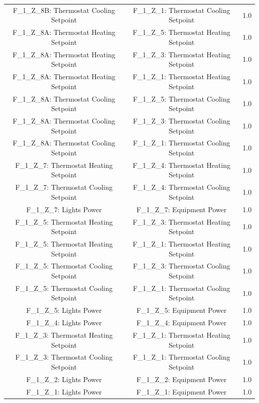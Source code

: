 \documentclass[aps, 10pt, a4paper]{article}
\begin{document}
\begin{longtable}{c|c||c}
                    F\_1\_Z\_8B: Thermostat Cooling Setpoint & F\_1\_Z\_1: Thermostat Cooling Setpoint & 1.0 \\
                    F\_1\_Z\_8A: Thermostat Heating Setpoint & F\_1\_Z\_5: Thermostat Heating Setpoint & 1.0 \\
                    F\_1\_Z\_8A: Thermostat Heating Setpoint & F\_1\_Z\_3: Thermostat Heating Setpoint & 1.0 \\
                    F\_1\_Z\_8A: Thermostat Heating Setpoint & F\_1\_Z\_1: Thermostat Heating Setpoint & 1.0 \\
                    F\_1\_Z\_8A: Thermostat Cooling Setpoint & F\_1\_Z\_5: Thermostat Cooling Setpoint & 1.0 \\
                    F\_1\_Z\_8A: Thermostat Cooling Setpoint & F\_1\_Z\_3: Thermostat Cooling Setpoint & 1.0 \\
                    F\_1\_Z\_8A: Thermostat Cooling Setpoint & F\_1\_Z\_1: Thermostat Cooling Setpoint & 1.0 \\
                    F\_1\_Z\_7: Thermostat Heating Setpoint & F\_1\_Z\_4: Thermostat Heating Setpoint & 1.0 \\
                    F\_1\_Z\_7: Thermostat Cooling Setpoint & F\_1\_Z\_4: Thermostat Cooling Setpoint & 1.0 \\
                    F\_1\_Z\_7: Lights Power & F\_1\_Z\_7: Equipment Power & 1.0 \\
                    F\_1\_Z\_5: Thermostat Heating Setpoint & F\_1\_Z\_3: Thermostat Heating Setpoint & 1.0 \\
                    F\_1\_Z\_5: Thermostat Heating Setpoint & F\_1\_Z\_1: Thermostat Heating Setpoint & 1.0 \\
                    F\_1\_Z\_5: Thermostat Cooling Setpoint & F\_1\_Z\_3: Thermostat Cooling Setpoint & 1.0 \\
                    F\_1\_Z\_5: Thermostat Cooling Setpoint & F\_1\_Z\_1: Thermostat Cooling Setpoint & 1.0 \\
                    F\_1\_Z\_5: Lights Power & F\_1\_Z\_5: Equipment Power & 1.0 \\
                    F\_1\_Z\_4: Lights Power & F\_1\_Z\_4: Equipment Power & 1.0 \\
                    F\_1\_Z\_3: Thermostat Heating Setpoint & F\_1\_Z\_1: Thermostat Heating Setpoint & 1.0 \\
                    F\_1\_Z\_3: Thermostat Cooling Setpoint & F\_1\_Z\_1: Thermostat Cooling Setpoint & 1.0 \\
                    F\_1\_Z\_2: Lights Power & F\_1\_Z\_2: Equipment Power & 1.0 \\
                    F\_1\_Z\_1: Lights Power & F\_1\_Z\_1: Equipment Power & 1.0 \\
                \end{longtable}
                
\end{document}
